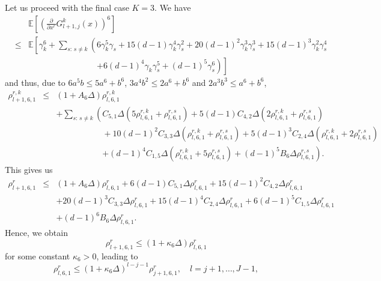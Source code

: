 \documentclass[11pt,a4paper]{amsart}
\theoremstyle{plain}
\theoremstyle{definition}
\theoremstyle{remark}
\numberwithin{equation}{section}
\newcommand*{\EE}{\mathbb E}
\renewcommand*{\doteq}{:=}
\begin{document}
Let us proceed with the final case $K=3$.
We have
\begin{eqnarray*}
&&\EE\left[\left(\frac{\partial}{\partial x^r}G_{l+1,j}^k(x)\right)^{6}\right]\\
&\leq&\EE\left[\gamma_k^6+\sum_{s:\,s\neq k}\left(6\gamma_k^5\gamma_s+15(d-1)\gamma_k^4\gamma_s^2+20(d-1)^2\gamma_k^3\gamma_s^3+15(d-1)^3\gamma_k^2\gamma_s^4\right.\right.\\
&&\phantom{\EE\left[\gamma_k^6+\sum_{s:\,s\neq k}\left(\right.\right.}\left.\left.+6(d-1)^4\gamma_k\gamma_s^5+(d-1)^5\gamma_s^6\right)\right]
\end{eqnarray*}
and thus, due to $6a^5b\le 5a^6+b^6$, $3a^4b^2\le 2a^6+b^6$ and $2a^3b^3\le a^6+b^6$,
\begin{eqnarray*}
\rho_{l+1,6,1}^{r,k}&\le & (1+A_{6}\Delta)\rho_{l,6,1}^{r,k}\\
&&+\sum_{s:\,s\neq k}\left(C_{5,1}\Delta(5\rho_{l,6,1}^{r,k}+\rho_{l,6,1}^{r,s})+5(d-1)C_{4,2}\Delta(2\rho_{l,6,1}^{r,k}+\rho_{l,6,1}^{r,s})\right.\\
&&\phantom{+\sum_{s:\,s\neq k}\left(\right.}+10(d-1)^2C_{3,3}\Delta(\rho_{l,6,1}^{r,k}+\rho_{l,6,1}^{r,s})+5(d-1)^3C_{2,4}\Delta(\rho_{l,6,1}^{r,k}+2\rho_{l,6,1}^{r,s})\\
&&\phantom{+\sum_{s:\,s\neq k}\left(\right.}\left.+(d-1)^4C_{1,5}\Delta(\rho_{l,6,1}^{r,k}+5\rho_{l,6,1}^{r,s})+ (d-1)^5B_{6}\Delta\rho_{l,6,1}^{r,s}\right).
\end{eqnarray*}
This gives us
\begin{eqnarray*}
\rho_{l+1,6,1}^{r}&\le & (1+A_{6}\Delta)\rho_{l,6,1}^{r}
+6(d-1)C_{5,1}\Delta\rho_{l,6,1}^{r}+15(d-1)^2C_{4,2}\Delta\rho_{l,6,1}^{r}\\
&&+20(d-1)^3C_{3,3}\Delta\rho_{l,6,1}^{r}+15(d-1)^4C_{2,4}\Delta\rho_{l,6,1}^{r}+6(d-1)^5C_{1,5}\Delta\rho_{l,6,1}^{r}\\
&&+ (d-1)^6B_{6}\Delta\rho_{l,6,1}^{r}.
\end{eqnarray*}
Hence, we obtain
\[
\rho_{l+1,6,1}^{r}\leq (1+\kappa_{6}\Delta)\rho_{l,6,1}^{r}
\]
for some constant $\kappa_{6}>0$, leading to 
\[
\rho_{l,6,1}^{r}\leq(1+\kappa_{6}\Delta)^{l-j-1}\rho_{j+1,6,1}^{r}
,\quad l=j+1,\ldots,J-1,
\]
\end{document}
